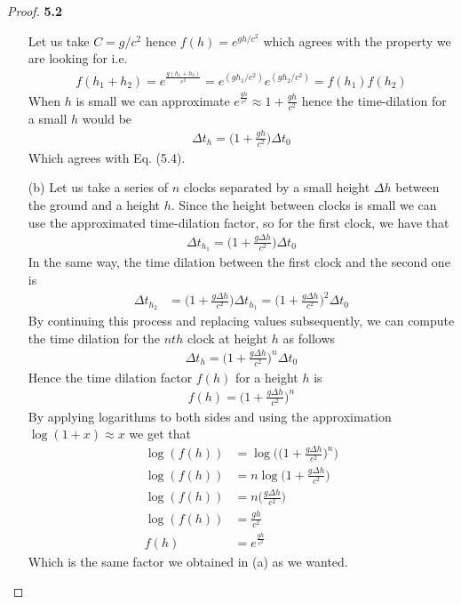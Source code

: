 \documentclass[11pt]{article}
\theoremstyle{definition}
\begin{document}
\begin{proof}{\textbf{5.2}}
\begin{itemize}
    Let us take $C = g/c^2$ hence $f(h) = e^{gh/c^2}$ which agrees with the
    property we are looking for i.e.
    \begin{align*}
        f(h_1 + h_2) = e^{\frac{g(h_1 + h_2)}{c^2}}
        = e^{(gh_1/c^2)}e^{(gh_2/c^2)} = f(h_1)f(h_2)
    \end{align*}
    When $h$ is small we can approximate
    $e^{\frac{gh}{c^2}} \approx 1 + \frac{gh}{c^2}$ hence the time-dilation for a
    small $h$ would be
    \begin{align*}
        \Delta t_h = \bigg(1 + \frac{gh}{c^2}\bigg) \Delta t_0
    \end{align*}
    Which agrees with Eq. (5.4).
\cleardoublepage
    \item [(b)] Let us take a series of $n$ clocks 
    separated by a small height $\Delta h$ between the ground and a height $h$.
    Since the height between clocks is small we can use the approximated
    time-dilation factor, so for the first clock, we have that
    \begin{align*}
        \Delta t_{h_1} = \bigg(1 + \frac{g\Delta h}{c^2}\bigg) \Delta t_0
    \end{align*} 
    In the same way, the time dilation between the first clock and
    the second one is
    \begin{align*}
        \Delta t_{h_2} &= \bigg(1 + \frac{g\Delta h}{c^2}\bigg) \Delta t_{h_1}
            = \bigg(1 + \frac{g\Delta h}{c^2}\bigg)^2 \Delta t_0
    \end{align*}
    By continuing this process and replacing values subsequently, we can
    compute the time dilation for the $nth$ clock at height $h$ as follows
    \begin{align*}
        \Delta t_{h} = \bigg(1 + \frac{g\Delta h}{c^2}\bigg)^n \Delta t_{0}
    \end{align*}
    Hence the time dilation factor $f(h)$ for a height $h$ is 
    \begin{align*}
        f(h) = \bigg(1 + \frac{g\Delta h}{c^2}\bigg)^n
    \end{align*}
    By applying logarithms to both sides and using the approximation
    $\log(1 + x) \approx x$ we get that
    \begin{align*}
       \log(f(h))
       &= \log \bigg(\bigg(1 + \frac{g\Delta h}{c^2}\bigg)^n\bigg)\\
       \log(f(h)) &= n\log \bigg(1 + \frac{g\Delta h}{c^2}\bigg)\\
       \log(f(h)) &= n\bigg(\frac{g\Delta h}{c^2}\bigg)\\
       \log(f(h)) &= \frac{g h}{c^2}\\
       f(h) &= e^{\frac{g h}{c^2}}
    \end{align*}
    Which is the same factor we obtained in (a) as we wanted.
\end{itemize}
\end{proof}
\end{document}
